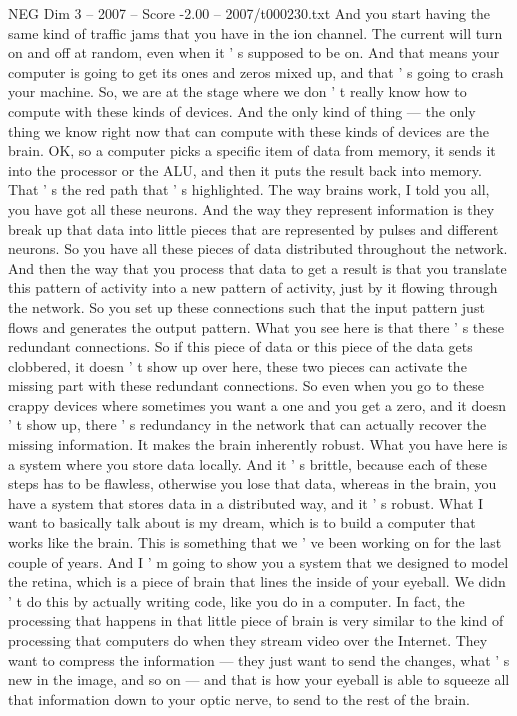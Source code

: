 \begin{textsample}{NEG Dim 3 – 2007 – Score -2.00 – 2007/t000230.txt}
And you start having the same kind of traffic jams that you have in the ion channel.
The current will turn on and off at random, even when it ' s supposed to be on.
And that means your computer is going to get its ones and zeros mixed up, and that ' s going to crash your machine.
So, we are at the stage where we don ' t really know how to compute with these kinds of devices.
And the only kind of thing — the only thing we know right now that can compute with these kinds of devices are the brain.
OK, so a computer picks a specific item of data from memory, it sends it into the processor or the ALU, and then it puts the result back into memory.
That ' s the red path that ' s highlighted.
The way brains work, I told you all, you have got all these neurons.
And the way they represent information is they break up that data into little pieces that are represented by pulses and different neurons.
So you have all these pieces of data distributed throughout the network.
And then the way that you process that data to get a result is that you translate this pattern of activity into a new pattern of activity, just by it flowing through the network.
So you set up these connections such that the input pattern just flows and generates the output pattern.
What you see here is that there ' s these redundant connections.
So if this piece of data or this piece of the data gets clobbered, it doesn ' t show up over here, these two pieces can activate the missing part with these redundant connections.
So even when you go to these crappy devices where sometimes you want a one and you get a zero, and it doesn ' t show up, there ' s redundancy in the network that can actually recover the missing information.
It makes the brain inherently robust.
What you have here is a system where you store data locally.
And it ' s brittle, because each of these steps has to be flawless, otherwise you lose that data, whereas in the brain, you have a system that stores data in a distributed way, and it ' s robust.
What I want to basically talk about is my dream, which is to build a computer that works like the brain.
This is something that we ' ve been working on for the last couple of years.
And I ' m going to show you a system that we designed to model the retina, which is a piece of brain that lines the inside of your eyeball.
We didn ' t do this by actually writing code, like you do in a computer.
In fact, the processing that happens in that little piece of brain is very similar to the kind of processing that computers do when they stream video over the Internet.
They want to compress the information — they just want to send the changes, what ' s new in the image, and so on — and that is how your eyeball is able to squeeze all that information down to your optic nerve, to send to the rest of the brain.

\end{textsample}
